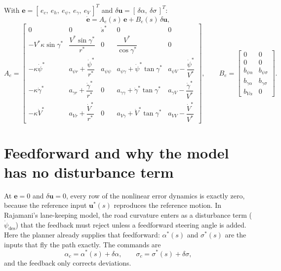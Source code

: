 \documentclass[11pt]{report}
\numberwithin{equation}{chapter}
\newcommand{\vb}[1]{\bm{#1}}
\newcommand{\sdot}{\dot s}
\begin{document}
With $\vb e = [\,e_c,\ e_h,\ e_\psi,\ e_\gamma,\ e_V\,]^T$ and $\delta\vb u = [\,\delta\alpha,\ \delta\sigma\,]^T$:
\begin{equation}
  \dot{\vb e} = A_e(s)\,\vb e + B_e(s)\,\delta\vb u,
\end{equation}
\begin{equation}
A_e =
\begin{bmatrix}
0 & 0 & \sdot^* & 0 & 0\\[4pt]
-V^*\kappa\sin\gamma^* & \dfrac{V^*\sin\gamma^*}{r^*} & 0 & \dfrac{V^*}{\cos\gamma^*} & 0\\[10pt]
-\kappa\dot\psi^* & a_{\psi r}+\dfrac{\dot\psi^*}{r^*} & a_{\psi\psi} & a_{\psi\gamma}+\dot\psi^*\tan\gamma^* & a_{\psi V}-\dfrac{\dot\psi^*}{V^*}\\[10pt]
-\kappa\dot\gamma^* & a_{\gamma r}+\dfrac{\dot\gamma^*}{r^*} & 0 & a_{\gamma\gamma}+\dot\gamma^*\tan\gamma^* & a_{\gamma V}-\dfrac{\dot\gamma^*}{V^*}\\[10pt]
-\kappa\dot V^* & a_{Vr}+\dfrac{\dot V^*}{r^*} & 0 & a_{V\gamma}+\dot V^*\tan\gamma^* & a_{VV}-\dfrac{\dot V^*}{V^*}
\end{bmatrix},
\qquad
B_e =
\begin{bmatrix}
0 & 0\\[4pt] 0 & 0\\[10pt] b_{\psi\alpha} & b_{\psi\sigma}\\[10pt] b_{\gamma\alpha} & b_{\gamma\sigma}\\[10pt] b_{V\alpha} & 0
\end{bmatrix}.
\label{eq:errmodel}
\end{equation}

\section{Feedforward and why the model has no disturbance term}

At $\vb e = 0$ and $\delta\vb u = 0$, every row of the nonlinear error dynamics is exactly
zero, because the reference input $\vb u^*(s)$ reproduces the reference motion. In
Rajamani's lane-keeping model, the road curvature enters as a disturbance term
($\dot\psi_{\text{des}}$) that the feedback must reject unless a feedforward steering angle
is added. Here the planner already supplies that feedforward: $\alpha^*(s)$ and
$\sigma^*(s)$ are the inputs that fly the path exactly. The commands are
\begin{equation}
  \alpha_c = \alpha^*(s) + \delta\alpha,\qquad \sigma_c = \sigma^*(s) + \delta\sigma,
\end{equation}
and the feedback only corrects deviations.
\end{document}
